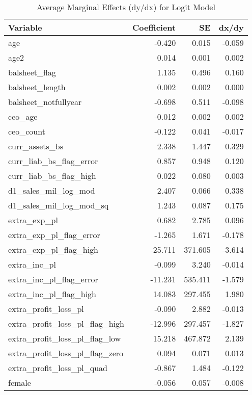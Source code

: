 \begin{table}

\caption{\label{tab:}Average Marginal Effects (dy/dx) for Logit Model}
\centering
\begin{tabular}[t]{l|r|r|r}
\hline
Variable & Coefficient & SE & dx/dy\\
\hline
age & -0.420 & 0.015 & -0.059\\
\hline
age2 & 0.014 & 0.001 & 0.002\\
\hline
balsheet\_flag & 1.135 & 0.496 & 0.160\\
\hline
balsheet\_length & 0.002 & 0.002 & 0.000\\
\hline
balsheet\_notfullyear & -0.698 & 0.511 & -0.098\\
\hline
ceo\_age & -0.012 & 0.002 & -0.002\\
\hline
ceo\_count & -0.122 & 0.041 & -0.017\\
\hline
curr\_assets\_bs & 2.338 & 1.447 & 0.329\\
\hline
curr\_liab\_bs\_flag\_error & 0.857 & 0.948 & 0.120\\
\hline
curr\_liab\_bs\_flag\_high & 0.022 & 0.080 & 0.003\\
\hline
d1\_sales\_mil\_log\_mod & 2.407 & 0.066 & 0.338\\
\hline
d1\_sales\_mil\_log\_mod\_sq & 1.243 & 0.087 & 0.175\\
\hline
extra\_exp\_pl & 0.682 & 2.785 & 0.096\\
\hline
extra\_exp\_pl\_flag\_error & -1.265 & 1.671 & -0.178\\
\hline
extra\_exp\_pl\_flag\_high & -25.711 & 371.605 & -3.614\\
\hline
extra\_inc\_pl & -0.099 & 3.240 & -0.014\\
\hline
extra\_inc\_pl\_flag\_error & -11.231 & 535.411 & -1.579\\
\hline
extra\_inc\_pl\_flag\_high & 14.083 & 297.455 & 1.980\\
\hline
extra\_profit\_loss\_pl & -0.090 & 2.882 & -0.013\\
\hline
extra\_profit\_loss\_pl\_flag\_high & -12.996 & 297.457 & -1.827\\
\hline
extra\_profit\_loss\_pl\_flag\_low & 15.218 & 467.872 & 2.139\\
\hline
extra\_profit\_loss\_pl\_flag\_zero & 0.094 & 0.071 & 0.013\\
\hline
extra\_profit\_loss\_pl\_quad & -0.867 & 1.484 & -0.122\\
\hline
female & -0.056 & 0.057 & -0.008\\

\end{tabular}
\end{table}
